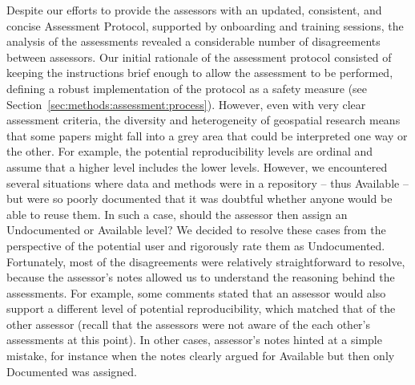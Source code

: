 \documentclass{josis}
\begin{document}

Despite our efforts to provide the assessors with an updated, consistent, and concise Assessment Protocol, supported by onboarding and training sessions, the analysis of the assessments revealed a considerable number of disagreements between assessors. 
Our initial rationale of the assessment protocol consisted of keeping the instructions brief enough to allow the assessment to be performed, defining a robust implementation of the protocol as a safety measure (see Section~\ref{sec:methods:assessment:process}). However, even with very clear assessment criteria, the diversity and heterogeneity of geospatial research means that some papers might fall into a grey area that could be interpreted one way or the other. 
For example, the potential reproducibility levels are ordinal and assume that a higher level includes the lower levels. 
However, we encountered several situations where data and methods were in a repository -- thus Available -- but were so poorly documented that it was doubtful whether anyone would be able to reuse them. 
In such a case, should the assessor then assign an Undocumented or Available level? We decided to resolve these cases from the perspective of the potential user and rigorously rate them as Undocumented.
Fortunately, most of the disagreements were relatively straightforward to resolve, because the assessor's notes allowed us to understand the reasoning behind the assessments. 
For example, some comments stated that an assessor would also support a different level of potential reproducibility, which matched that of the other assessor (recall that the assessors were not aware of the each other's assessments at this point). 
In other cases, assessor's notes hinted at a simple mistake, for instance when the notes clearly argued for Available but then only Documented was assigned. 
\end{document}
